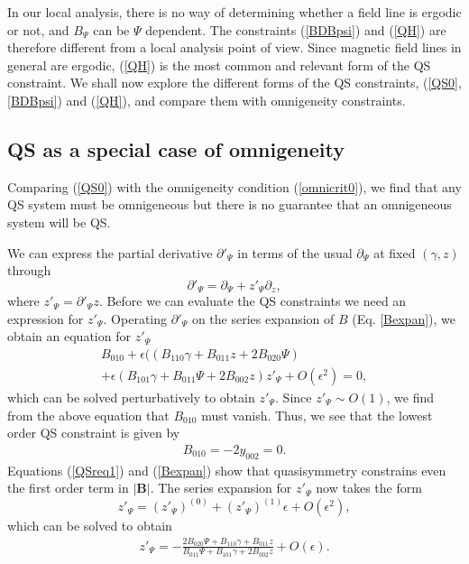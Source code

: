 \documentclass[aip,pop,reprint]{revtex4-1}
\newcommand{\be}{\begin{equation}}
\newcommand{\ee}{\end{equation}}
\newcommand*{\ep}{\epsilon}
\newcommand*{\B}{\bm{B}}
\begin{document}
In our local analysis, there is no way of determining whether a field line is ergodic or not, and $B_\Psi$ can be $\Psi$ dependent. The constraints (\ref{BDBpsi}) and (\ref{QH}) are therefore different from a local analysis point of view. Since magnetic field lines in general are ergodic, (\ref{QH}) is the most common and relevant form of the QS constraint. We shall now explore the different forms of the QS constraints, (\ref{QS0},\ref{BDBpsi}) and (\ref{QH}), and compare them with omnigeneity constraints.

\subsection{QS as a special case of omnigeneity}

Comparing (\ref{QS0}) with the omnigeneity condition (\ref{omnicrit0}), we find that any QS system must be omnigeneous but there is no guarantee that an omnigeneous system will be QS.

We can express the partial derivative $\partial'_\Psi$ in terms of the usual $\partial_\Psi$ at fixed $(\gamma,z)$ through 
\be
\partial'_\Psi=\partial_\Psi+z'_\Psi\partial_z,
\ee
where $z'_\Psi=\partial'_\Psi z$. Before we can evaluate the QS constraints we need an expression for $z'_\Psi$. Operating $\partial'_\Psi$ on the series expansion of $B$ (Eq. \ref{Bexpan}), we obtain an equation for $z'_\Psi$
\begin{align}
B_{010} +\epsilon ((B_{110} \gamma +B_{011}z +2B_{020}\Psi)\nonumber \\
+\epsilon(B_{101}\gamma +B_{011}\Psi +2 B_{002}z)z'_\Psi +O(\ep^2)=0,  \label{zpsi}
\end{align}
which can be solved perturbatively to obtain $z'_\Psi$. Since $z'_\Psi \sim O(1)$, we find from the above equation that $B_{010}$ must vanish. Thus, we see that the lowest order QS constraint is given by 
\begin{align}
B_{010}=-2y_{002}=0.
\label{QSreq1}
\end{align}
Equations (\ref{QSreq1}) and (\ref{Bexpan}) show that quasisymmetry constrains even the first order term in $|\B|$. The series expansion for $z'_\Psi$ now takes the form $$z'_\Psi = (z'_\Psi)^{(0)}+(z'_\Psi)^{(1)}\ep +O(\ep^2),$$ which can be  solved to obtain 
\begin{align}
z'_{\Psi} = -\frac{2 B_{020}\Psi +B_{110}\gamma +B_{011}z}{B_{011}\Psi +B_{101}\gamma +2B_{002}z}+O(\ep).
\label{zpsi0}
\end{align}
\end{document}
